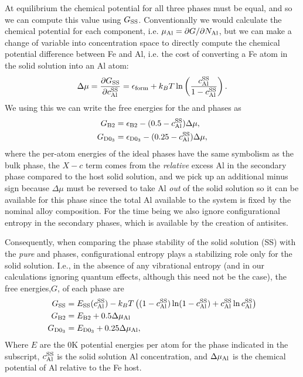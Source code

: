 At equilibrium the chemical potential for all three phases must be equal, and so we can compute this value using $G_{\mathrm{SS}}$.
Conventionally we would calculate the chemical potential for each component, i.e. $\mu_{\mathrm{Al}} = \partial G / \partial N_{\mathrm{Al}}$,
but we can make a change of variable into concentration space to directly compute the chemical potential difference between Fe and Al, i.e. the cost of converting a Fe atom in the solid solution into an Al atom:
%
\begin{equation}
    \label{eq:ss_chem_pot}
    \Delta \mu = \frac{\partial G_{\mathrm{SS}}}{\partial c_{\mathrm{Al}}^{\mathrm{SS}}} = \epsilon_{\mathrm{form}} + k_B T \ln \left(\frac{c_{\mathrm{Al}}^{\mathrm{SS}}}{1 - c_{\mathrm{Al}}^{\mathrm{SS}}} \right).
\end{equation}
%
We using this we can write the free energies for the \BTWO and \DOTHREE phases as
%
\begin{eqnarray}
    G_{\mathrm{B}2} &= \epsilon_{\mathrm{B}2} - (0.5 - c_{\mathrm{Al}}^{\mathrm{SS}})\Delta \mu, \label{eq:b2_super_simple} \\
    G_{\mathrm{D}0_3} &= \epsilon_{\mathrm{D}0_3} - (0.25 - c_{\mathrm{Al}}^{\mathrm{SS}})\Delta \mu, \label{eq:d03_super_simple}
\end{eqnarray}
%
where the per-atom energies of the ideal phases have the same symbolism as the bulk phase, the $X-c$ term comes from the \emph{relative} excess Al in the secondary phase compared to the host solid solution, and we pick up an additional minus sign because $\Delta \mu$ must be reversed to take Al \emph{out} of the solid solution so it can be available for this phase since the total Al available to the system is fixed by the nominal alloy composition.
For the time being we also ignore configurational entropy in the secondary phases, which is available by the creation of antisites.

Consequently, when comparing the phase stability of the solid solution (SS) with the \emph{pure} \BTWO and \DOTHREE phases, configurational entropy plays a stabilizing role only for the solid solution.
I.e., in the absence of any vibrational entropy (and in our calculations ignoring quantum effects, although this need not be the case), the free energies,$G$, of each phase are
%
\begin{eqnarray}
    G_{\mathrm{SS}} &= E_{\mathrm{SS}}(c_{\mathrm{Al}}^{\mathrm{SS}}) -k_B T \left( (1-c_{\mathrm{Al}}^{\mathrm{SS}})\ln(1 - c_{\mathrm{Al}}^{\mathrm{SS}}) + c_{\mathrm{Al}}^{\mathrm{SS}}\ln c_{\mathrm{Al}}^{\mathrm{SS}} \right) \label{eq:conf_G_SS} \\
    G_{\mathrm{B}2} &= E_{\mathrm{B}2} + 0.5 \Delta \mu_{\mathrm{Al}} \label{eq:conf_G_B2} \\
    G_{\mathrm{D}0_3} &= E_{\mathrm{D}0_3} + 0.25 \Delta \mu_{\mathrm{Al}},\label{eq:conf_G_D03}
\end{eqnarray}
%
Where $E$ are the 0K potential energies per atom for the phase indicated in the subscript, $c_{\mathrm{Al}}^{\mathrm{SS}}$ is the solid solution Al concentration, and $\Delta \mu_{\mathrm{Al}}$ is the chemical potential of Al relative to the Fe host.

